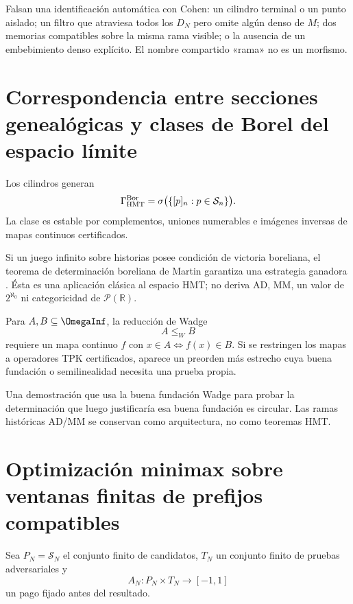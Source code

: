 \begin{remark}
Falsan una identificación automática con Cohen: un cilindro terminal o un
punto aislado; un filtro que atraviesa todos los \(D_N\) pero omite algún
denso de \(M\); dos memorias compatibles sobre la misma rama visible; o la
ausencia de un embebimiento denso explícito. El nombre compartido «rama» no
es un morfismo.
\end{remark}

\section{Correspondencia entre secciones genealógicas y clases de Borel del espacio límite}

Los cilindros generan
\[
 \Gamma_{\rm HMT}^{\rm Bor}
 =
 \sigma\bigl(\{[p]_n:p\in\mathcal S_n\}\bigr).
\]
La clase es estable por complementos, uniones numerables e imágenes inversas
de mapas continuos certificados.

Si un juego infinito sobre historias posee condición de victoria boreliana,
el teorema de determinación boreliana de Martin garantiza una estrategia
ganadora \citep{martin1975}. Ésta es una aplicación clásica al espacio HMT;
no deriva AD, MM, un valor de \(2^{\aleph_0}\) ni categoricidad de
\(\mathcal P(\mathbb R)\).

Para \(A,B\subseteq\OmegaInf\), la reducción de Wadge
\[
 A\le_WB
\]
requiere un mapa continuo \(f\) con \(x\in A\iff f(x)\in B\). Si se
restringen los mapas a operadores TPK certificados, aparece un preorden más
estrecho cuya buena fundación o semilinealidad necesita una prueba propia.

\begin{remark}
Una demostración que usa la buena fundación Wadge para probar la
determinación que luego justificaría esa buena fundación es circular. Las
ramas históricas AD/MM se conservan como arquitectura, no como teoremas HMT.
\end{remark}

\section{Optimización minimax sobre ventanas finitas de prefijos compatibles}

Sea \(P_N=\mathcal S_N\) el conjunto finito de candidatos, \(T_N\) un conjunto
finito de pruebas adversariales y
\[
  A_N:P_N\times T_N\to[-1,1]
\]
un pago fijado antes del resultado.

